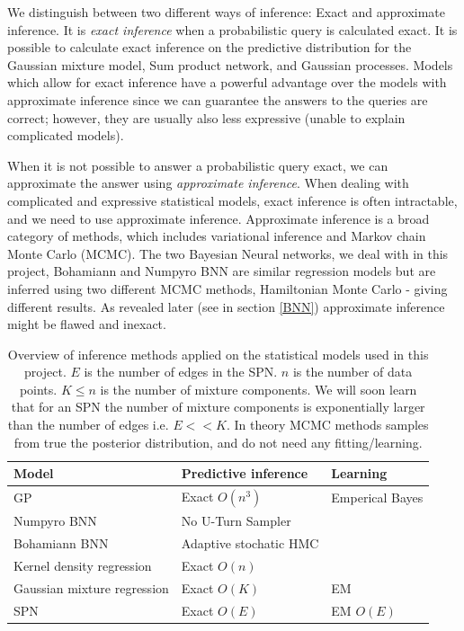 We distinguish between two different ways of inference: Exact and approximate inference. It is
\textit{exact inference} when a probabilistic query is calculated exact. It is possible to
calculate exact inference on the predictive distribution for the Gaussian mixture model, Sum product
network, and Gaussian processes. Models which allow for exact inference have a powerful advantage
over the models with approximate inference since we can guarantee the answers to the queries are
correct; however, they are usually also less expressive (unable to explain complicated models). 

When it is not possible to answer a probabilistic query exact, we can approximate the answer using
\textit{approximate inference}. When dealing with complicated and expressive statistical models,
exact inference is often intractable, and we need to use approximate inference. Approximate
inference is a broad category of methods, which includes variational inference and Markov chain
Monte Carlo (MCMC). The two Bayesian Neural networks, we deal with in this project, Bohamiann and
Numpyro BNN are similar regression models but are inferred using two different MCMC methods,
Hamiltonian Monte Carlo - giving different results. As revealed later (see in section \ref{BNN})
approximate inference might be flawed and inexact. 

\begin{table}[H]
    \centering
    \begin{tabular}{l|l|l}
    \textbf{Model}       & \textbf{Predictive inference}    &   \textbf{Learning} \\ \hline
    GP                          & Exact $O(n^3)$            & Emperical Bayes\\
    Numpyro BNN                 & No U-Turn Sampler         & \\
    Bohamiann BNN               & Adaptive stochatic HMC    & \\
    Kernel density regression   & Exact $O(n)$              & \\
    Gaussian mixture regression & Exact $O(K)$              & EM  \\
    SPN                         & Exact $O(E)$              &  EM $O(E)$\\
    \end{tabular}
    \caption{Overview of inference methods applied on the statistical models used in this project.
            $E$ is the number of edges in the SPN. $n$ is the number of data points. $K \leq n$ is
            the number of mixture components. We will soon learn that for an SPN the number of
            mixture components is exponentially larger than the number of edges i.e. $E << K$. In theory
            MCMC methods samples from true the posterior distribution, and do not need any
            fitting/learning. }
\end{table}


